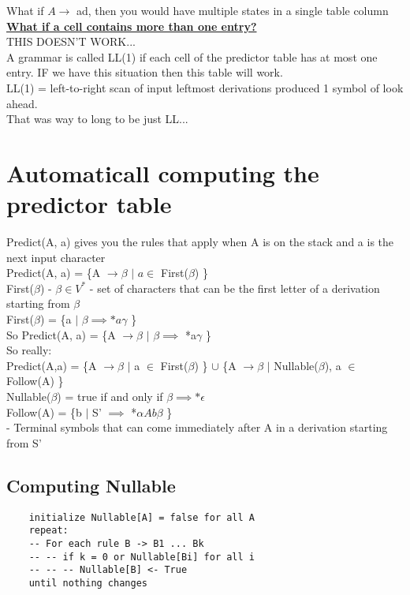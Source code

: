 \documentclass[12pt]{article}
\newcommand{\myt}[1]{\textbf{\underline{#1}}}
\begin{document}
	What if $A \rightarrow$ ad, then you would have multiple states in a single table column\\
	
	\myt{What if a cell contains more than one entry?}\\
	THIS DOESN'T WORK...\\
	
	A grammar is called LL(1) if each cell of the predictor table has at most one entry. IF we have this situation then this table will work.\\
	
	LL(1) = left-to-right scan of input leftmost derivations produced 1 symbol of look ahead.\\
	That was way to long to be just LL...\\
	
	\section*{Automaticall computing the predictor table}
	
	Predict(A, a) gives you the rules that apply when A is on the stack and a is the next input character\\
	
	Predict(A, a) = \{A $\rightarrow \beta$ $|$ $a \in$ First($\beta$) \}\\
	First($\beta$) - $\beta \in V^*$ - set of characters that can be the first letter of a derivation starting from $\beta$\\
	First($\beta$) = \{a $|$ $\beta \implies *a\gamma$ \}\\
	
	So Predict(A, a) = \{A $\rightarrow \beta$ $|$ $\beta \implies$ *a$\gamma$ \}\\
	
	So really:\\
	
	Predict(A,a) = \{A $\rightarrow \beta$ $|$ a $\in$ First($\beta$) \} $\cup$ \{A $\rightarrow \beta$ $|$ Nullable($\beta$), a $\in$ Follow(A) \}\\
	Nullable($\beta$) = true if and only if $\beta \implies *\epsilon$\\
	Follow(A) = \{b $|$ S' $\implies$ *$\alpha Ab \beta$ \}\\
	- Terminal symbols that can come immediately after A in a derivation starting from S'\\
	
	\subsection*{Computing Nullable}
	\begin{verbatim}
	initialize Nullable[A] = false for all A
	repeat:
	-- For each rule B -> B1 ... Bk
	-- -- if k = 0 or Nullable[Bi] for all i
	-- -- -- Nullable[B] <- True
	until nothing changes
	\end{verbatim}
	
\end{document}
